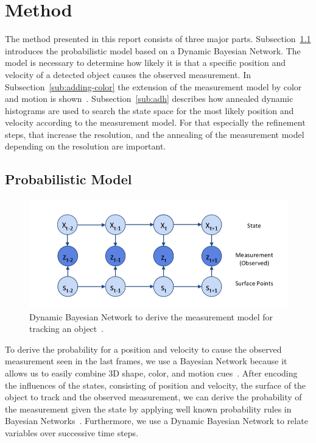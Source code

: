 \documentclass[twoside,a4paper,article]{combine}
\begin{document}
\section{Method}
\label{sec:method}
The method presented in this report consists of three major
parts. Subsection~\ref{sub:probabilistic-model} introduces the
probabilistic model based on a Dynamic Bayesian Network. The model is
necessary to determine how likely it is that a specific position and
velocity of a detected object causes the observed
measurement. In Subsection~\ref{sub:adding-color} the extension of the
measurement model by color and motion is shown~\cite{paper}.
Subsection~\ref{sub:adh} describes how annealed dynamic
histograms are used to search the state space for the most likely
position and velocity according to the measurement model. For that
especially the refinement steps, that increase the resolution, and the
annealing of the measurement model depending on the resolution are
important.

\subsection{Probabilistic Model}
\label{sub:probabilistic-model}

\begin{figure}
  \center
  \includegraphics[width=.8\linewidth]{dbn}
  \caption{Dynamic Bayesian Network to derive the measurement model
    for tracking an object~\cite{paper}.}
  \label{fig:dbn}
\end{figure}

To derive the probability for a position and velocity to cause the
observed measurement seen in the last frames, we use a Bayesian
Network because it allows us to easily combine 3D shape, color, and
motion cues~\cite{paper}. After encoding the influences of the states,
consisting of position and velocity, the surface of the object to
track and the observed measurement, we can derive the
probability of the measurement given the state by applying well known
probability rules in Bayesian Networks~\cite{ai-modern}. Furthermore,
we use a Dynamic Bayesian Network to relate variables over successive
time steps.
\end{document}

